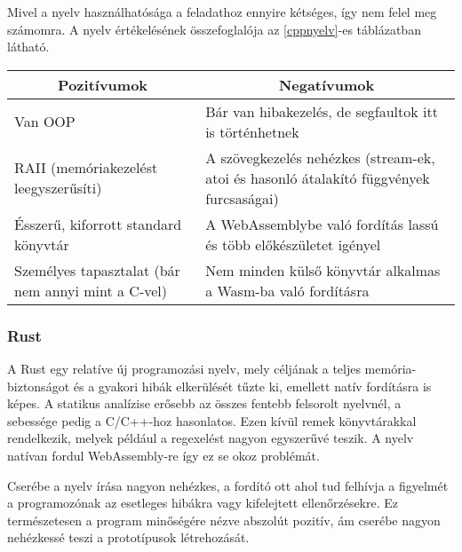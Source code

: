 Mivel a nyelv használhatósága a feladathoz ennyire kétséges, így nem felel meg számomra. A nyelv értékelésének összefoglalója az \ref{cppnyelv}-es táblázatban látható.

\begin{center}
  \begin{tabularx}{\textwidth}{X X}
    \hline
    \multicolumn{1}{c}{\bfseries{Pozitívumok}}         & \multicolumn{1}{c}{\bfseries{Negatívumok}}                                             \\
    \hline
    Van OOP                                            & Bár van hibakezelés, de segfaultok itt is történhetnek                                 \\
    RAII (memóriakezelést leegyszerűsíti)              & A szövegkezelés nehézkes (stream-ek, atoi és hasonló átalakító függvények furcsaságai) \\
    Ésszerű, kiforrott standard könyvtár               & A WebAssemblybe való fordítás lassú és több előkészületet igényel                      \\
    Személyes tapasztalat (bár nem annyi mint a C-vel) & Nem minden külső könyvtár alkalmas a Wasm-ba való fordításra                           \\
    \hline
  \end{tabularx}
\end{center}

\subsubsection{Rust}

\cite{rust}

A Rust egy relatíve új programozási nyelv, mely céljának a teljes memória-biztonságot és a gyakori hibák elkerülését tűzte ki, emellett natív fordításra is képes. A statikus analízise erősebb az összes fentebb felsorolt nyelvnél, a sebessége pedig a C/C++-hoz hasonlatos. Ezen kívül remek könyvtárakkal rendelkezik, melyek például a regexelést nagyon egyszerűvé teszik. A nyelv natívan fordul WebAssembly-re így ez se okoz problémát.

Cserébe a nyelv írása nagyon nehézkes, a fordító ott ahol tud felhívja a figyelmét a programozónak az esetleges hibákra vagy kifelejtett ellenőrzésekre. Ez természetesen a program minőségére nézve abszolút pozitív, ám cserébe nagyon nehézkessé teszi a prototípusok létrehozását.

